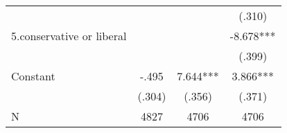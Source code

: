 {\begin{tabular}{l*{3}{c}}
                                                  &               &               &      (.310)   \\
5.conservative or liberal                         &               &               &      -8.678***\\
                                                  &               &               &      (.399)   \\
Constant                                          &       -.495   &       7.644***&       3.866***\\
                                                  &      (.304)   &      (.356)   &      (.371)   \\
\hline
N                                                 &        4827   &        4706   &        4706   \\
\hline\hline
\end{tabular}
}
